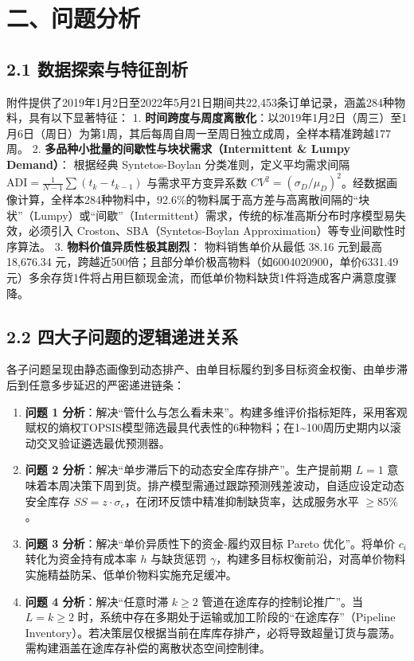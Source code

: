 \section{二、问题分析}\label{ux4e8cux95eeux9898ux5206ux6790}

\subsection{2.1
数据探索与特征剖析}\label{ux6570ux636eux63a2ux7d22ux4e0eux7279ux5f81ux5256ux6790}

附件提供了2019年1月2日至2022年5月21日期间共22,453条订单记录，涵盖284种物料，具有以下显著特征：
1.
\textbf{时间跨度与周度离散化}：以2019年1月2日（周三）至1月6日（周日）为第1周，其后每周自周一至周日独立成周，全样本精准跨越177周。
2. \textbf{多品种小批量的间歇性与块状需求（Intermittent \& Lumpy
Demand）}： 根据经典 Syntetos-Boylan 分类准则，定义平均需求间隔
\(\text{ADI} = \frac{1}{N-1}\sum (t_k - t_{k-1})\) 与需求平方变异系数
\(CV^2 = (\sigma_D/\mu_D)^2\)。经数据画像计算，全样本284种物料中，92.6\%的物料属于高方差与高离散间隔的``块状''（Lumpy）或``间歇''（Intermittent）需求，传统的标准高斯分布时序模型易失效，必须引入
Croston、SBA（Syntetos-Boylan Approximation）等专业间歇性时序算法。 3.
\textbf{物料价值异质性极其剧烈}： 物料销售单价从最低 38.16 元到最高
18,676.34
元，跨越近500倍；且部分单价极高物料（如6004020900，单价6331.49元）多余存货1件将占用巨额现金流，而低单价物料缺货1件将造成客户满意度骤降。

\subsection{2.2
四大子问题的逻辑递进关系}\label{ux56dbux5927ux5b50ux95eeux9898ux7684ux903bux8f91ux9012ux8fdbux5173ux7cfb}

各子问题呈现由静态画像到动态排产、由单目标履约到多目标资金权衡、由单步滞后到任意多步延迟的严密递进链条：

\begin{enumerate}
\def\labelenumi{\arabic{enumi}.}
\tightlist
\item
  \textbf{问题 1
  分析}：解决``管什么与怎么看未来''。构建多维评价指标矩阵，采用客观赋权的熵权TOPSIS模型筛选最具代表性的6种物料；在1\textasciitilde100周历史期内以滚动交叉验证遴选最优预测器。
\item
  \textbf{问题 2 分析}：解决``单步滞后下的动态安全库存排产''。生产提前期
  \(L=1\)
  意味着本周决策下周到货。排产模型需通过跟踪预测残差波动，自适应设定动态安全库存
  \(SS = z \cdot \sigma_e\)，在闭环反馈中精准抑制缺货率，达成服务水平
  \(\ge 85\%\)。
\item
  \textbf{问题 3 分析}：解决``单价异质性下的资金-履约双目标 Pareto
  优化''。将单价 \(c_i\) 转化为资金持有成本率 \(h\) 与缺货惩罚
  \(\gamma\)，构建多目标权衡前沿，对高单价物料实施精益防呆、低单价物料实施充足缓冲。
\item
  \textbf{问题 4 分析}：解决``任意时滞 \(k\ge 2\)
  管道在途库存的控制论推广''。当 \(L=k\ge 2\)
  时，系统中存在多期处于运输或加工阶段的``在途库存''（Pipeline
  Inventory）。若决策层仅根据当前在库库存排产，必将导致超量订货与震荡。需构建涵盖在途库存补偿的离散状态空间控制律。
\end{enumerate}

